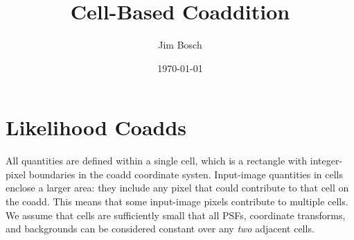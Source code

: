 \documentclass[DM,authoryear,toc]{lsstdoc}
\title{Cell-Based Coaddition}
\author{%
Jim Bosch
}
\date{\today}
\begin{document}
\maketitle

\section{Likelihood Coadds}

All quantities are defined within a single cell, which is a rectangle with integer-pixel boundaries in the coadd coordinate systen.
Input-image quantities in cells enclose a larger area: they include any pixel that could contribute to that cell on the coadd.
This means that some input-image pixels contribute to multiple cells.
We assume that cells are sufficiently small that all PSFs, coordinate transforms, and backgrounds can be considered constant over any \emph{two} adjacent cells.
\end{document}
